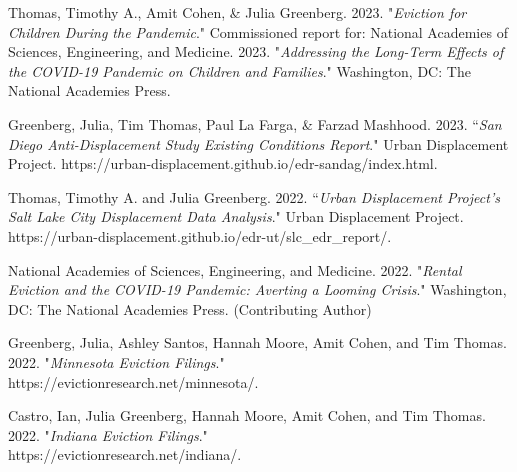 \begin{cvparagraph}

Thomas, Timothy A., Amit Cohen, \& Julia Greenberg. 2023. "\emph{Eviction for Children During the Pandemic}." Commissioned report for: National Academies of Sciences, Engineering, and Medicine. 2023. "\emph{Addressing the Long-Term Effects of the COVID-19 Pandemic on Children and Families}." Washington, DC: The National Academies Press.
\end{cvparagraph}

\begin{cvparagraph}

Greenberg, Julia, Tim Thomas, Paul La Farga, \& Farzad Mashhood. 2023. “\emph{San Diego Anti-Displacement Study Existing Conditions Report}." Urban Displacement Project. https://urban-displacement.github.io/edr-sandag/index.html.
\end{cvparagraph}

\begin{cvparagraph}

Thomas, Timothy A. and Julia Greenberg. 2022. “\emph{Urban Displacement Project’s Salt Lake City Displacement Data Analysis}." Urban Displacement Project. https://urban-displacement.github.io/edr-ut/slc\_edr\_report/.
\end{cvparagraph}

\begin{cvparagraph}

National Academies of Sciences, Engineering, and Medicine. 2022. "\emph{Rental Eviction and the COVID-19 Pandemic: Averting a Looming Crisis}." Washington, DC: The National Academies Press. (Contributing Author)
\end{cvparagraph}

\begin{cvparagraph}

Greenberg, Julia, Ashley Santos, Hannah Moore, Amit Cohen, and Tim Thomas. 2022. "\emph{Minnesota Eviction Filings}."\\ https://evictionresearch.net/minnesota/.
\end{cvparagraph}

\begin{cvparagraph}

Castro, Ian, Julia Greenberg, Hannah Moore, Amit Cohen, and Tim Thomas. 2022. "\emph{Indiana Eviction Filings}."\\
https://evictionresearch.net/indiana/.
\end{cvparagraph}

